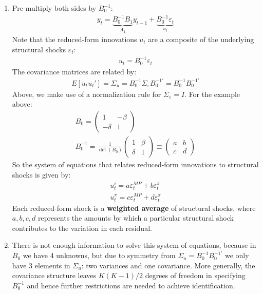 \begin{enumerate}
\item
Pre-multiply both sides by \(B_0^{-1}\):
\begin{align*}
y_t = \underbrace{B_0^{-1} B_1}_{A_1} y_{t-1} + \underbrace{B_0^{-1} \varepsilon_t}_{u_t}
\end{align*}
Note that the reduced-form innovations \(u_t\) are a composite of the underlying structural shocks \(\varepsilon_t\):
\begin{align*}
u_t = B_0^{-1} \varepsilon_t
\end{align*}
The covariance matrices are related by:
\begin{align*}
E[u_t u_t'] = \Sigma_u = B_0^{-1} \Sigma_\varepsilon B_0^{-1'} = B_0^{-1} B_0^{-1'}
\end{align*}
Above, we make use of a normalization rule for \(\Sigma_\varepsilon=I\).
For the example above:
\begin{align*}
B_0 = \begin{pmatrix} 1 & -\beta \\ -\delta & 1 \end{pmatrix}
\\
B_0^{-1} = \frac{1}{\det(B_0)} \begin{pmatrix} 1 & \beta \\ \delta & 1 \end{pmatrix} \equiv \begin{pmatrix} a & b \\ c & d \end{pmatrix}
\end{align*}
So the system of equations that relates reduced-form innovations to structural shocks is given by:
\begin{align*}
u_t^{i} = a \varepsilon_t^{MP} + b \varepsilon_t^{\pi}
\\
u_t^{\pi} = c \varepsilon_t^{MP} + d \varepsilon_t^{\pi}
\end{align*}
Each reduced-form shock is a \textbf{weighted average} of structural shocks,
  where \(a,b,c,d\) represents the amounts by which a particular structural shock contributes to the variation in each residual.

\item
There is not enough information to solve this system of equations, because in \(B_0\) we have 4 unknowns,
  but due to symmetry from \(\Sigma_u = B_0^{-1} B_0^{-1'}\) we only have 3 elements in \(\Sigma_u\): two variances and one covariance.
More generally, the covariance structure leaves \(K(K-1)/2\) degrees of freedom in specifying \(B_0^{-1}\)
  and hence further restrictions are needed to achieve identification.


\end{enumerate}
